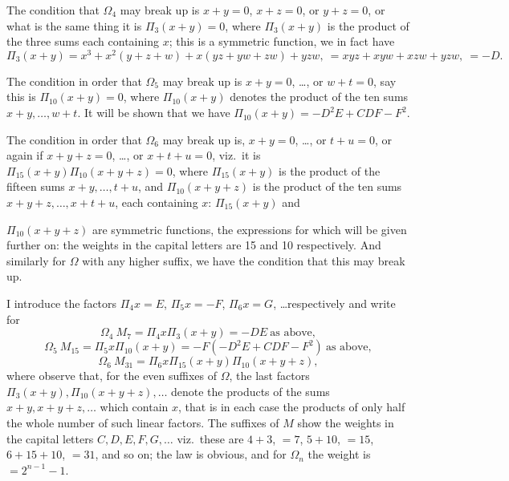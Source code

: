 \documentclass[11pt]{article}
\begin{document}
The condition that $\Omega_4$ may break up is $x + y = 0$, $x + z = 0$, or $y + z = 0$, or what is the same thing it is $\Pi_3 (x + y) = 0$, where $\Pi_3 (x + y)$ is the product of the three sums each containing $x$; this is a symmetric function, we in fact have
\[
\Pi_3 (x + y) = x^3 + x^2 (y + z + w) + x (yz + yw + zw) + yzw,\ = xyz + xyw + xzw + yzw,\ = -D.
\]

The condition in order that $\Omega_5$ may break up is $x + y = 0$, \ldots, or $w + t = 0$, say this is $\Pi_{10} (x + y) = 0$, where $\Pi_{10}(x + y)$ denotes the product of the ten sums $x + y, \ldots, w + t$. It will be shown that we have $\Pi_{10}(x + y) = -D^2E + CDF - F^2$.

The condition in order that $\Omega_6$ may break up is, $x + y = 0$, \ldots, or $t + u = 0$, or again if $x + y + z = 0$, \ldots, or $x + t + u = 0$, viz.\ it is $\Pi_{15} (x + y) \Pi_{10}(x + y + z) = 0$, where $\Pi_{15}(x + y)$ is the product of the fifteen sums $x + y, \ldots, t + u$, and $\Pi_{10}(x + y + z)$ is the product of the ten sums $x + y + z, \ldots, x + t + u$, each containing $x$: $\Pi_{15}(x + y)$ and

\clearpage
$\Pi_{10}(x + y + z)$ are symmetric functions, the expressions for which will be given further on: the weights in the capital letters are 15 and 10 respectively. And similarly for $\Omega$ with any higher suffix, we have the condition that this may break up.

I introduce the factors $\Pi_4 x = E$, $\Pi_5 x = -F$, $\Pi_6 x = G$, \ldots respectively and write for
\[
\Omega_4\ M_7 = \Pi_4 x \Pi_3 (x + y) = -DE\ \text{as above},
\]
\[
\Omega_5\ M_{15} = \Pi_5 x \Pi_{10} (x + y) = -F(-D^2E + CDF - F^2)\ \text{as above},
\]
\[
\Omega_6\ M_{31} = \Pi_6 x \Pi_{15} (x + y) \Pi_{10} (x + y + z),
\]
where observe that, for the even suffixes of $\Omega$, the last factors $\Pi_3 (x + y), \Pi_{10}(x + y + z), \ldots$ denote the products of the sums $x + y, x + y + z, \ldots$ which contain $x$, that is in each case the products of only half the whole number of such linear factors. The suffixes of $M$ show the weights in the capital letters $C, D, E, F, G, \ldots$ viz.\ these are $4 + 3$, $= 7$, $5 + 10$, $= 15$, $6 + 15 + 10$, $= 31$, and so on; the law is obvious, and for $\Omega_n$ the weight is $= 2^{n-1} - 1$.
\end{document}
